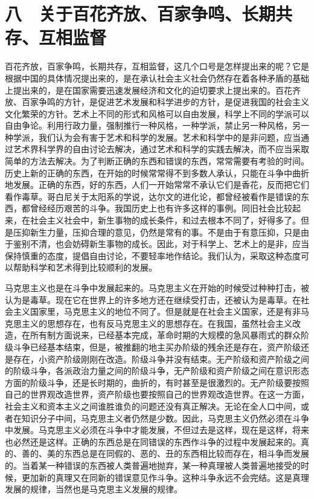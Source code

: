 \section{八　关于百花齐放、百家争鸣、长期共存、互相监督}

百花齐放，百家争鸣，长期共存，互相监督，这几个口号是怎样提出来的呢？它是根据中国的具体情况提出来的，是在承认社会主义社会仍然存在着各种矛盾的基础上提出来的，是在国家需要迅速发展经济和文化的迫切要求上提出来的。百花齐放、百家争鸣的方针，是促进艺术发展和科学进步的方针，是促进我国的社会主义文化繁荣的方针。艺术上不同的形式和风格可以自由发展，科学上不同的学派可以自由争论。利用行政力量，强制推行一种风格，一种学派，禁止另一种风格，另一种学派，我们认为会有害于艺术和科学的发展。艺术和科学中的是非问题，应当通过艺术界科学界的自由讨论去解决，通过艺术和科学的实践去解决，而不应当采取简单的方法去解决。为了判断正确的东西和错误的东西，常常需要有考验的时间。历史上新的正确的东西，在开始的时候常常得不到多数人承认，只能在斗争中曲折地发展。正确的东西，好的东西，人们一开始常常不承认它们是香花，反而把它们看作毒草。哥白尼关于太阳系的学说，达尔文的进化论，都曾经被看作是错误的东西，都曾经经历艰苦的斗争。我国历史上也有许多这样的事例。同旧社会比较起来，在社会主义社会中，新生事物的成长条件，和过去根本不同了，好得多了。但是压抑新生力量，压抑合理的意见，仍然是常有的事。不是由于有意压抑，只是由于鉴别不清，也会妨碍新生事物的成长。因此，对于科学上、艺术上的是非，应当保持慎重的态度，提倡自由讨论，不要轻率地作结论。我们认为，采取这种态度可以帮助科学和艺术得到比较顺利的发展。

马克思主义也是在斗争中发展起来的。马克思主义在开始的时候受过种种打击，被认为是毒草。现在它在世界上的许多地方还在继续受打击，还被认为是毒草。在社会主义国家里，马克思主义的地位不同了。但是就是在社会主义国家，还是有非马克思主义的思想存在，也有反马克思主义的思想存在。在我国，虽然社会主义改造，在所有制方面说来，已经基本完成，革命时期的大规模的急风暴雨式的群众阶级斗争已经基本结束，但是，被推翻的地主买办阶级的残余还是存在，资产阶级还是存在，小资产阶级刚刚在改造。阶级斗争并没有结束。无产阶级和资产阶级之间的阶级斗争，各派政治力量之间的阶级斗争，无产阶级和资产阶级之间在意识形态方面的阶级斗争，还是长时期的，曲折的，有时甚至是很激烈的。无产阶级要按照自己的世界观改造世界，资产阶级也要按照自己的世界观改造世界。在这一方面，社会主义和资本主义之间谁胜谁负的问题还没有真正解决。无论在全人口中间，或者在知识分子中间，马克思主义者仍然是少数。因此，马克思主义仍然必须在斗争中发展。马克思主义必须在斗争中才能发展，不但过去是这样，现在是这样，将来也必然还是这样。正确的东西总是在同错误的东西作斗争的过程中发展起来的。真的、善的、美的东西总是在同假的、恶的、丑的东西相比较而存在，相斗争而发展的。当着某一种错误的东西被人类普遍地抛弃，某一种真理被人类普遍地接受的时候，更加新的真理又在同新的错误意见作斗争。这种斗争永远不会完结。这是真理发展的规律，当然也是马克思主义发展的规律。

